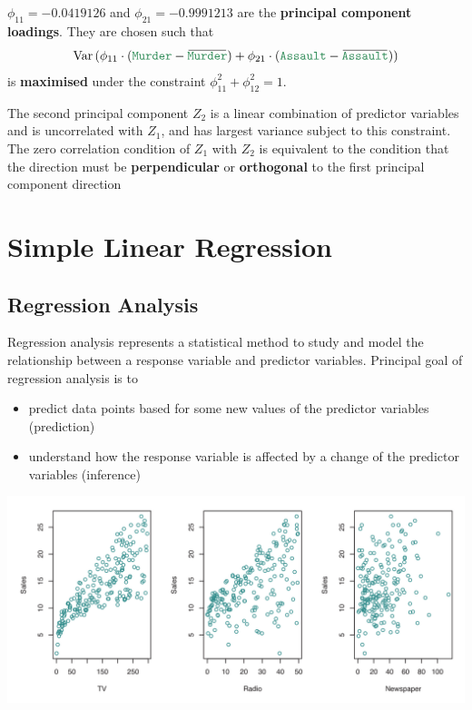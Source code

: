 \documentclass[11pt]{article}
\newcommand*\Var[1]{\mathop{\text{Var}}\left(#1\right)}
\newcommand*\predvar[1]{{\color{SeaGreen4} \texttt{#1}}}
\newcommand{\overbar}[1]{\mkern 1.5mu\overline{\mkern-1.5mu#1\mkern-1.5mu}\mkern 1.5mu}
\begin{document}
$\phi_{11} = -0.0419126$ and $\phi_{21} = -0.9991213$ are the \textbf{principal component loadings}. They are chosen such that
\begin{equation*}
\Var{\phi_{11}\cdot(\text{\predvar{Murder}} - \overbar{\text{\predvar{Murder}}}) + \phi_{21}\cdot(\text{\predvar{Assault}} - \overbar{\text{\predvar{Assault}}})}
\end{equation*}
is \textbf{maximised} under the constraint $\phi_{11}^2 + \phi_{12}^2 = 1$.

The second principal component $Z_2$ is a linear combination of predictor variables and is uncorrelated with $Z_1$, and has largest variance subject to this constraint. The zero correlation condition of $Z_1$ with $Z_2$ is equivalent to the condition that the direction must be \textbf{perpendicular} or \textbf{orthogonal} to the first principal component direction

\section{Simple Linear Regression}
\subsection{Regression Analysis}
Regression analysis represents a statistical method to study and model the relationship between a response variable and predictor variables. Principal goal of regression analysis is to
\begin{itemize}[noitemsep]
	\item predict data points based for some new values of the predictor variables (prediction)
	\item understand how the response variable is affected by a change of the predictor variables (inference)
\end{itemize}

\begin{center}
	\includegraphics[width=0.8\linewidth]{img/sales_advertising}
\end{center}
\end{document}
